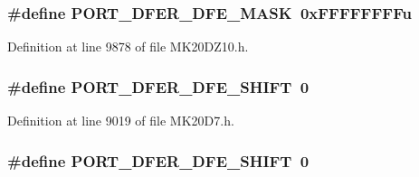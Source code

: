\subsubsection[{\texorpdfstring{P\+O\+R\+T\+\_\+\+D\+F\+E\+R\+\_\+\+D\+F\+E\+\_\+\+M\+A\+SK}{PORT_DFER_DFE_MASK}}]{\setlength{\rightskip}{0pt plus 5cm}\#define P\+O\+R\+T\+\_\+\+D\+F\+E\+R\+\_\+\+D\+F\+E\+\_\+\+M\+A\+SK~0x\+F\+F\+F\+F\+F\+F\+F\+Fu}\hypertarget{group___p_o_r_t___register___masks_ga450c760a693b115dc630c8a5edb628df}{}\label{group___p_o_r_t___register___masks_ga450c760a693b115dc630c8a5edb628df}


Definition at line 9878 of file M\+K20\+D\+Z10.\+h.

\subsubsection[{\texorpdfstring{P\+O\+R\+T\+\_\+\+D\+F\+E\+R\+\_\+\+D\+F\+E\+\_\+\+S\+H\+I\+FT}{PORT_DFER_DFE_SHIFT}}]{\setlength{\rightskip}{0pt plus 5cm}\#define P\+O\+R\+T\+\_\+\+D\+F\+E\+R\+\_\+\+D\+F\+E\+\_\+\+S\+H\+I\+FT~0}\hypertarget{group___p_o_r_t___register___masks_ga7bcd0509509d5a2865efab49eef02c56}{}\label{group___p_o_r_t___register___masks_ga7bcd0509509d5a2865efab49eef02c56}


Definition at line 9019 of file M\+K20\+D7.\+h.

\subsubsection[{\texorpdfstring{P\+O\+R\+T\+\_\+\+D\+F\+E\+R\+\_\+\+D\+F\+E\+\_\+\+S\+H\+I\+FT}{PORT_DFER_DFE_SHIFT}}]{\setlength{\rightskip}{0pt plus 5cm}\#define P\+O\+R\+T\+\_\+\+D\+F\+E\+R\+\_\+\+D\+F\+E\+\_\+\+S\+H\+I\+FT~0}\hypertarget{group___p_o_r_t___register___masks_ga7bcd0509509d5a2865efab49eef02c56}{}\label{group___p_o_r_t___register___masks_ga7bcd0509509d5a2865efab49eef02c56}


